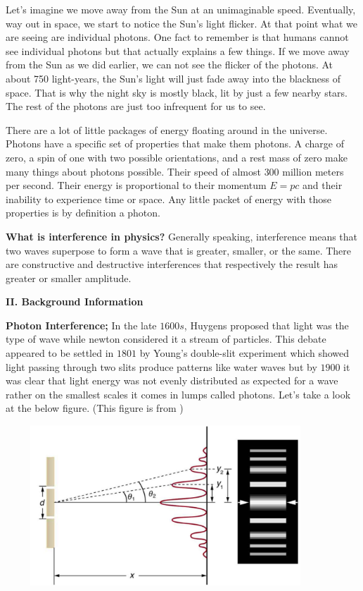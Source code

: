 \documentclass[fleqn]{article}
\begin{document}
  Let’s imagine we move away from the Sun at an unimaginable speed. Eventually, way out in space, we start to notice the Sun’s light 
  flicker. At that point what we are seeing are individual photons. One fact to remember is that humans cannot see individual 
  photons but that actually explains a few things. If we move away from the Sun as we did earlier, we can not see the flicker 
  of the photons. At about 750 light-years, the Sun’s light will just fade away into the blackness of space. That is why the night
  sky is mostly black, lit by just a few nearby stars. The rest of the photons are just too infrequent for us to see.

  There are a lot of little packages of energy floating around in the universe. Photons have a specific set of properties that make 
  them photons. A charge of zero, a spin of one with two possible orientations, and a rest mass of zero make many things about photons 
  possible. Their speed of almost $300$ million meters per second. Their energy is proportional to their momentum $E=pc$ and 
  their inability to experience time or space. Any little packet of energy with those properties is by definition a photon.

  \pagebreak

  \textbf{What is interference in physics?} Generally speaking, interference means that two waves superpose to form a wave that is 
  greater, smaller, or the same.\textcite{Two} There are constructive and destructive interferences that respectively the 
  result has greater or smaller amplitude.  

  \vspace{20px}


  \textbf{II. Background Information}

  \vspace{10px}

  \textbf{Photon Interference;} In the late $1600s$, Huygens proposed that light was the type of wave while newton considered it a stream of particles. 
  This debate appeared to be settled in $1801$ by Young's double-slit experiment which showed light passing through two 
  slits produce patterns like water waves but by $1900$ it was clear that light energy was not evenly distributed as expected for 
  a wave rather on the smallest scales it comes in lumps called photons. Let's take a look at the below figure. (This figure is from \textcite{Three})
  
  \includegraphics[height=6cm, width=12cm]{1.JPG}
\end{document}
